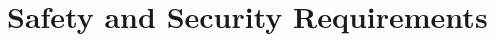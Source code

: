 \documentclass{article}
\begin{document}
\begin{landscape}
\begin{center}
\begin{longtable}{|l|  p{3cm}  p{4cm}  p{3cm}  p{4cm}  p{2cm}  p{1cm}|}
    \cline{2-7}
    \hline

    \end{longtable}
\end{center}
\end{landscape}


\newpage

\section{Safety and Security Requirements}
\end{document}
